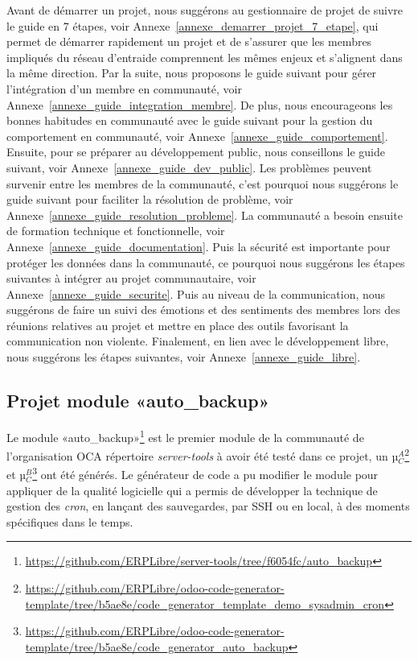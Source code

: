 Avant de démarrer un projet, nous suggérons au gestionnaire de projet de suivre le guide en 7 étapes, voir Annexe~\ref{annexe_demarrer_projet_7_etape}, qui permet de démarrer rapidement un projet et de s'assurer que les membres impliqués du réseau d'entraide comprennent les mêmes enjeux et s'alignent dans la même direction. Par la suite, nous proposons le guide suivant pour gérer l'intégration d'un membre en communauté, voir Annexe~\ref{annexe_guide_integration_membre}. De plus, nous encourageons les bonnes habitudes en communauté avec le guide suivant pour la gestion du comportement en communauté, voir Annexe~\ref{annexe_guide_comportement}. Ensuite, pour se préparer au développement public, nous conseillons le guide suivant, voir Annexe~\ref{annexe_guide_dev_public}. Les problèmes peuvent survenir entre les membres de la communauté, c'est pourquoi nous suggérons le guide suivant pour faciliter la résolution de problème, voir Annexe~\ref{annexe_guide_resolution_probleme}. La communauté a besoin ensuite de formation technique et fonctionnelle, voir Annexe~\ref{annexe_guide_documentation}. Puis la sécurité est importante pour protéger les données dans la communauté, ce pourquoi nous suggérons les étapes suivantes à intégrer au projet communautaire, voir Annexe~\ref{annexe_guide_securite}. Puis au niveau de la communication, nous suggérons de faire un suivi des émotions et des sentiments des membres lors des réunions relatives au projet et mettre en place des outils favorisant la communication non violente. Finalement, en lien avec le développement libre, nous suggérons les étapes suivantes, voir Annexe~\ref{annexe_guide_libre}.


\subsection{Projet module «auto\_backup»}

Le module «auto\_backup»\footnote{\url{https://github.com/ERPLibre/server-tools/tree/f6054fc/auto_backup}} est le premier module de la communauté de l'organisation OCA répertoire \textit{server-tools} à avoir été testé dans ce projet, un µ$_C^A$\footnote{\url{https://github.com/ERPLibre/odoo-code-generator-template/tree/b5ae8e/code_generator_template_demo_sysadmin_cron}} et µ$_C^B$\footnote{\url{https://github.com/ERPLibre/odoo-code-generator-template/tree/b5ae8e/code_generator_auto_backup}} ont été générés. Le générateur de code a pu modifier le module pour appliquer de la qualité logicielle qui a permis de développer la technique de gestion des \textit{cron}, en lançant des sauvegardes, par SSH ou en local, à des moments spécifiques dans le temps.

